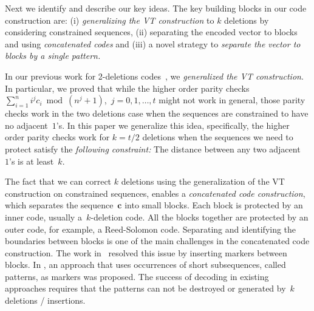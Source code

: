 \documentclass[10pt,a4paper,onecolumn]{IEEEtran}
\newcommand{\1}{\mathbbold{1}}
\newcommand{\boldc}{\mathbf{c}}
\begin{document}
Next we identify and describe our key ideas. The key building blocks in our code construction are: (i) \textit{generalizing the  VT construction} to $k$ deletions by considering constrained sequences, (ii) separating the encoded vector to blocks and using \textit{concatenated codes} and (iii) a novel strategy to \textit{separate the vector to blocks by a single pattern.}

In our previous work for 2-deletions codes~\cite{sima2018two}, we \textit{generalized the VT construction}. In particular, we proved that while the higher order parity checks~$\sum^n_{i=1}i^jc_i  \bmod( n^j+1)$,~$j=0,1,\ldots,t$ might not work in general, those parity checks work in the two deletions case when  the sequences are constrained to have no adjacent~$1$'s. 
In this paper we generalize this idea, specifically, the higher order parity checks work for $k=t/2$ deletions when the sequences we need to protect satisfy the \textit{following constraint: } The distance between any two adjacent ~$1$'s is at least~$k$. 

The fact that we can correct $k$ deletions using the generalization of the VT construction on constrained sequences, enables a \textit{concatenated code construction}, which separates the sequence~$\boldc$ into small blocks. Each block is protected by an inner code, usually a~$k$-deletion code. All the blocks together are protected by an outer code, for example, a Reed-Solomon code. Separating and identifying the boundaries between blocks is one of the main challenges in the concatenated code construction. The work in~\cite{schulman1999asymptotically,guruswami2017deletion} resolved this issue by inserting markers between blocks.
In \cite{brakensiek2016efficient}, an approach that uses occurrences of short subsequences, called patterns, as markers was proposed. The success of decoding in existing approaches requires that the patterns can not be destroyed or generated by~$k$ deletions / insertions.  
\end{document}
